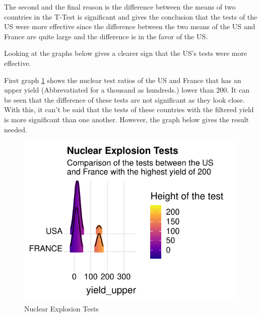 \documentclass[
  12pt,
]{article}
\begin{document}
The second and the final reason is the difference between the means of two countries in the T-Test is significant and gives the conclusion that the tests of the US were more effective since the difference between the two means of the US and France are quite large and the difference is in the favor of the US.

Looking at the graphs below gives a clearer sign that the US's tests were more effective.

\newpage

First graph \ref{fig:plot1} shows the nuclear test ratios of the US and France that has an upper yield (Abbrevatiated for a thousand as hundreds.) lower than 200. It can be seen that the difference of these tests are not significant as they look close. With this, it can't be said that the tests of these countries with the filtered yield is more significant than one another. However, the graph below gives the result needed.

\begin{figure}

{\centering \includegraphics{project_files/figure-latex/plot1-1} 

}

\caption{Nuclear Explosion Tests}\label{fig:plot1}
\end{figure}
\end{document}
